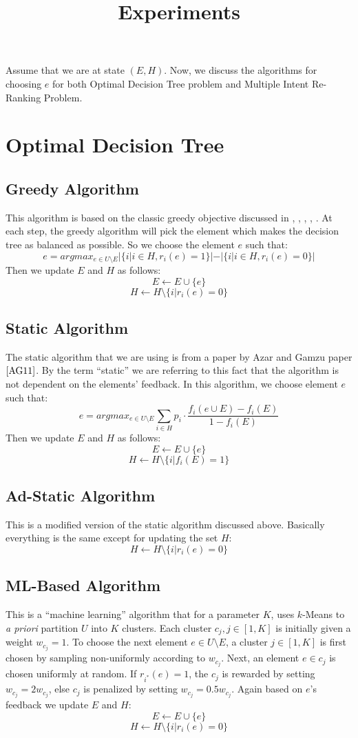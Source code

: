 \documentclass[12pt,epsfig,graphicx,amsmath,color]{article}
\title{Experiments}
\begin{document}
Assume that we are at state $(E,H)$. Now, we discuss the algorithms for choosing $e$ for both Optimal Decision Tree problem and Multiple Intent Re-Ranking Problem.
\section{Optimal Decision Tree}
\subsection{Greedy Algorithm}
This algorithm is based on the classic greedy objective discussed in \cite{KPB99}, \cite{D01}, \cite{AH12}, \cite{CPRAM11}, \cite{GB09}. At each step, the greedy algorithm will pick the element which makes the decision tree as balanced as possible. So we choose the element $e$ such that: 
$$e = argmax_{e\in U\setminus E}|\{i|i\in H, r_i(e)=1\}|-|\{i|i\in H, r_i(e)=0\}|$$
Then we update $E$ and $H$ as follows:
$$E\leftarrow E\cup \{e\}$$
$$H\leftarrow H \setminus \{i|r_i(e)=0\}$$
\subsection{Static Algorithm}
The static algorithm that we are using is from a paper by Azar and Gamzu paper $\cite{AG11}$. By the term ``static'' we are referring to this fact that the algorithm is not dependent on the elements' feedback. In this algorithm, we choose element $e$ such that:
$$e = argmax_{e\in U\setminus E} \sum\limits_{i\in H} p_i \cdot \frac{f_i(e\cup E)-f_i(E)}{1-f_i(E)} $$
Then we update $E$ and $H$ as follows:
$$E\leftarrow E\cup \{e\}$$
$$H\leftarrow H \setminus \{i|f_i(E)=1\}$$
\subsection{Ad-Static Algorithm}
This is a modified version of the static algorithm discussed above. Basically everything is the same except for updating the set $H$:
$$H\leftarrow H \setminus \{i|r_i(e)=0\}$$
\subsection{ML-Based Algorithm}
This is a ``machine learning'' algorithm that for a parameter $K$, uses $k$-Means \cite{arthur2007k} to \textit{a priori} partition $U$ into $K$ clusters. Each cluster $c_j, j\in{}[1,K]$ is initially given a weight $w_{c_j} = 1$.
To choose the next element $e\in{}U\setminus{}E$, a cluster $j\in{}[1,K]$ is
first chosen by sampling non-uniformly according to $w_{c_j}$.
Next, an element $e\in{}c_j$ is chosen uniformly at random.
If $r_{i^*}(e)=1$, the $c_j$ is rewarded by setting $w_{c_j} =
2 w_{c_j}$, else $c_j$ is penalized by setting $w_{c_j} = 0.5 w_{c_j}$. Again based on $e$'s feedback we update $E$ and $H$:
$$E\leftarrow E\cup \{e\}$$
$$H\leftarrow H \setminus \{i|r_i(e)=0\}$$
\end{document}
